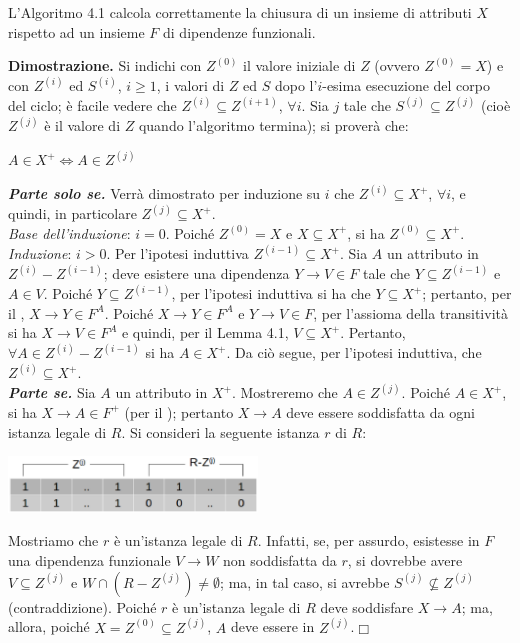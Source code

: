 \begin{theo}
L'Algoritmo 4.1 calcola correttamente la chiusura di un insieme di attributi $X$ rispetto ad un insieme $F$ 
di dipendenze funzionali.
\end{theo}
\textbf{Dimostrazione.} Si indichi con $Z^{(0)}$ il valore iniziale di $Z$ (ovvero $Z^{(0)} = X$) e con 
$Z^{(i)}$ ed $S^{(i)}$, $i \geq 1$, i valori di $Z$ ed $S$ dopo l'$i$-esima esecuzione del corpo del ciclo; 
\`e facile vedere che $Z^{(i)} \subseteq Z^{(i+1)}$, $\forall i$. Sia $j$ tale che $S^{(j)} \subseteq Z^{(j)}$
(cio\`e $Z^{(j)}$ \`e il valore di $Z$ quando l'algoritmo termina); si proverà che:
\begin{center}
 \begin{math}
   A \in X^+ \Leftrightarrow A \in Z^{(j)}
 \end{math}
\end{center}
\emph{\textbf{Parte solo se.}} Verrà dimostrato per induzione su $i$ che $Z^{(i)} \subseteq X^+$, $\forall i$, 
e quindi, in particolare $Z^{(j)} \subseteq X^+$.\\
\emph{Base dell'induzione}: $i=0$. Poiché $Z^{(0)} = X$ e $X\subseteq X^+$, si ha $Z^{(0)} \subseteq X^+$.\\
\emph{Induzione}: $i>0$. Per l'ipotesi induttiva $Z^{(i-1)} \subseteq X^+$. Sia $A$ un attributo in $Z^{(i)}
-Z^{(i-1)}$; deve esistere una dipendenza $Y \rightarrow V \in F$ tale che $Y\subseteq Z^{(i-1)}$ e $A \in V$.
Poiché $Y \subseteq Z^{(i-1)}$, per l'ipotesi induttiva si ha che $Y \subseteq X^+$; pertanto, per il 
, $X \rightarrow Y \in F^A$. Poiché $X \rightarrow Y \in F^A$ e $Y \rightarrow V
\in F$, per l'assioma della transitività si ha $X \rightarrow V \in F^A$ e quindi, per il Lemma 4.1, $V 
\subseteq X^+$. Pertanto, $\forall A \in Z^{(i)} -Z^{(i-1)}$ si ha $A \in X^+$. Da ciò segue, per l'ipotesi 
induttiva, che $Z^{(i)} \subseteq X^+$.\\
\emph{\textbf{Parte se.}} Sia $A$ un attributo in $X^+$. Mostreremo che $A \in Z^{(j)}$. Poiché $A \in X^+$,
si ha $X \rightarrow A \in F^+$ (per il ); pertanto $X \rightarrow A$ deve 
essere soddisfatta da ogni istanza legale di $R$. Si consideri la seguente istanza $r$ di $R$:
\begin{center}
 \includegraphics[width=250px]{img_4_4_3.eps}
\end{center}
Mostriamo che $r$ è un'istanza legale di $R$. Infatti, se, per assurdo, esistesse in $F$ una dipendenza
funzionale $V \rightarrow W$ non soddisfatta da $r$, si dovrebbe avere $V \subseteq Z^{(j)}$ e $W \cap 
(R-Z^{(j)})\not = \emptyset$; ma, in tal caso, si avrebbe $S^{(j)} \not \subseteq Z^{(j)}$ (contraddizione).
Poiché $r$ è un'istanza legale di $R$ deve soddisfare $X \rightarrow A$; ma, allora, poiché $X = Z^{(0)} 
\subseteq Z^{(j)}$, $A$ deve essere in $Z^{(j)}$.\hfill $\Box$

